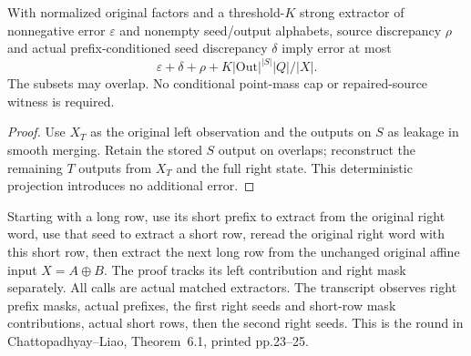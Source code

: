 \begin{theorem}
  \label{thm:lowerbounds-algebraic-smooth-independence}
  \leanok
  With normalized original factors and a threshold-$K$ strong extractor
  of nonnegative error $\varepsilon$ and nonempty seed/output alphabets,
  source discrepancy $\rho$ and actual prefix-conditioned seed discrepancy
  $\delta$ imply error at most
  \[
    \varepsilon+\delta+\rho+
      K|\mathrm{Out}|^{|S|}|Q|/|X|.
  \]
  The subsets may overlap. No conditional point-mass cap or repaired-source
  witness is required.
\end{theorem}
\begin{proof}
  \leanok
  Use $X_T$ as the original left observation and the outputs on $S$ as
  leakage in smooth merging. Retain the stored $S$ output on overlaps;
  reconstruct the remaining $T$ outputs from $X_T$ and the full right
  state. This deterministic projection introduces no additional error.
\end{proof}

\begin{definition}
  \label{def:lowerbounds-algebraic-affine-round}
  \leanok
  Starting with a long row, use its short prefix to extract from the
  original right word, use that seed to extract a short row, reread the
  original right word with this short row, then extract the next long row
  from the unchanged original affine input $X=A\mathbin{\oplus}B$.
  The proof tracks its left contribution and right mask separately.
  All calls are actual matched extractors.
  The transcript observes right prefix masks, actual prefixes, the first
  right seeds and short-row mask contributions, actual short rows, then
  the second right seeds. This is the round in Chattopadhyay--Liao,
  Theorem~6.1, printed pp.23--25.
\end{definition}

